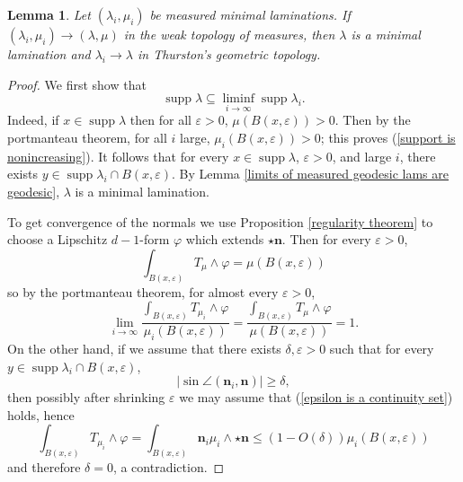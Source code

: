 \documentclass[reqno,11pt]{amsart}
\DeclareMathOperator{\supp}{supp}
\newcommand{\normal}{\mathbf n}
\newtheorem{lemma}[theorem]{Lemma}
\theoremstyle{definition}
\numberwithin{equation}{section}
\begin{document}
\begin{lemma}\label{measured implies Thurston}
Let $(\lambda_i, \mu_i)$ be measured minimal laminations.
If $(\lambda_i, \mu_i) \to (\lambda, \mu)$ in the weak topology of measures, then $\lambda$ is a minimal lamination and $\lambda_i \to \lambda$ in Thurston's geometric topology.
\end{lemma}
\begin{proof}
We first show that
\begin{equation}\label{support is nonincreasing}
	\supp \lambda \subseteq \liminf_{i \to \infty} \supp \lambda_i.
\end{equation}
Indeed, if $x \in \supp \lambda$ then for all $\varepsilon > 0$, $\mu(B(x, \varepsilon)) > 0$.
Then by the portmanteau theorem, for all $i$ large, $\mu_i(B(x, \varepsilon)) > 0$; this proves (\ref{support is nonincreasing}).
It follows that for every $x \in \supp \lambda$, $\varepsilon > 0$, and large $i$, there exists $y \in \supp \lambda_i \cap B(x, \varepsilon)$.
By Lemma \ref{limits of measured geodesic lams are geodesic}, $\lambda$ is a minimal lamination.

To get convergence of the normals we use Proposition \ref{regularity theorem} to choose a Lipschitz $d-1$-form $\varphi$ which extends $\star \normal$.
Then for every $\varepsilon > 0$,
$$\int_{B(x, \varepsilon)} T_\mu \wedge \varphi = \mu(B(x, \varepsilon))$$
so by the portmanteau theorem, for almost every $\varepsilon > 0$,
\begin{equation}\label{epsilon is a continuity set}
	\lim_{i \to \infty} \frac{\int_{B(x, \varepsilon)} T_{\mu_i} \wedge \varphi}{\mu_i(B(x, \varepsilon))} = \frac{\int_{B(x, \varepsilon)} T_\mu \wedge \varphi}{\mu(B(x, \varepsilon))} = 1.
\end{equation}
On the other hand, if we assume that there exists $\delta, \varepsilon > 0$ such that for every $y \in \supp \lambda_i \cap B(x, \varepsilon)$,
$$|\sin \angle(\normal_i, \normal)| \geq \delta,$$
then possibly after shrinking $\varepsilon$ we may assume that (\ref{epsilon is a continuity set}) holds, hence
$$\int_{B(x, \varepsilon)} T_{\mu_i} \wedge \varphi = \int_{B(x, \varepsilon)} \normal_i\mu_i \wedge \star \normal \leq (1 - O(\delta)) \mu_i(B(x, \varepsilon))$$
and therefore $\delta = 0$, a contradiction.
\end{proof}
\end{document}
